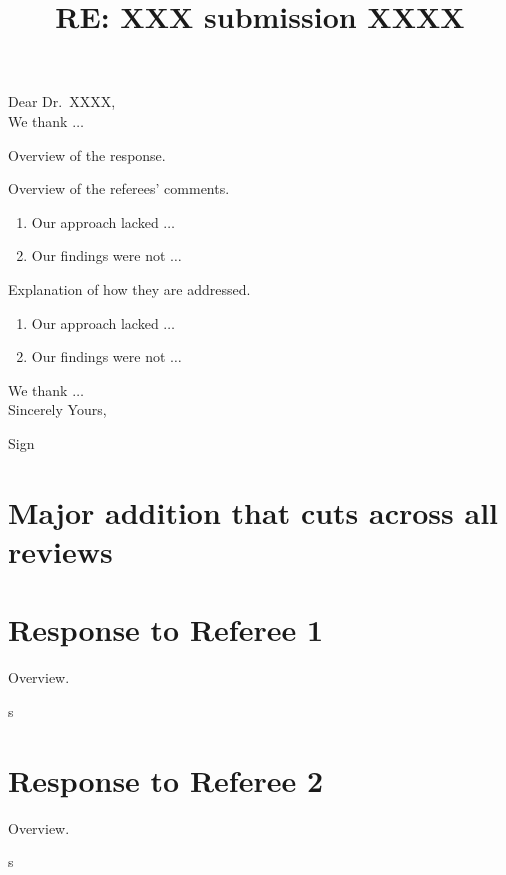 \documentclass[12pt]{article}
\title{RE: XXX submission XXXX}
\date{}
\makeatletter
\newcommand{\rcomment}[1]{%
\vspace{10pt}
\begin{sectionbox}
s #1
\end{sectionbox}
}
\renewcommand{\maketitle}{\bgroup\setlength{\parindent}{0pt}
\begin{flushleft}
\Large  \textbf{\@title}
\end{flushleft}\egroup
}
\makeatother
\begin{document}
\maketitle

\bigskip
\noindent Dear Dr.~XXXX, \\

We thank $\dots$ 

Overview of the response.

Overview of the referees' comments.


\begin{enumerate}
    \itemsep0em
    \item Our approach lacked $\dots$ 
    \item Our findings were not $\dots$ 
\end{enumerate}

Explanation of how they are addressed. 


\begin{enumerate}
    \itemsep0em
    \item Our approach lacked $\dots$ 
    \item Our findings were not $\dots$ 
\end{enumerate}

We thank $\dots$ \\

Sincerely Yours,

Sign

\listoftodos


\clearpage
\tableofcontents
\clearpage


\section{Major addition that cuts across all reviews}\label{sec:major}

\lipsum[1]{} 


%
%
\clearpage
\section{Response to Referee 1}

Overview. 

\rcomment{%
\lipsum[1]{} 
}

\lipsum[1]{}

%
%
\clearpage
\section{Response to Referee 2}

Overview. 

\rcomment{%
\lipsum[1]{} 
}

\lipsum[1]{}

%
%
\clearpage
\printbibliography{}
\end{document}
